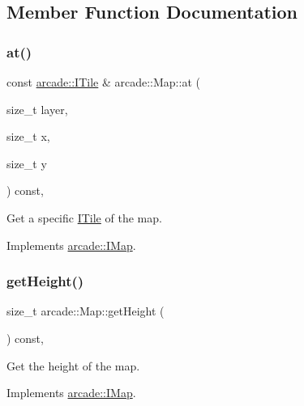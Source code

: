 \subsection{Member Function Documentation}
\mbox{\label{classarcade_1_1_map_a8032d00c437cad8cedb646a0a1eb4bb1}} 
\subsubsection{\texorpdfstring{at()}{at()}}
{\footnotesize\ttfamily const \hyperlink{classarcade_1_1_i_tile}{arcade\+::\+I\+Tile} \& arcade\+::\+Map\+::at (\begin{DoxyParamCaption}\item[{size\+\_\+t}]{layer,  }\item[{size\+\_\+t}]{x,  }\item[{size\+\_\+t}]{y }\end{DoxyParamCaption}) const\hspace{0.3cm}{\ttfamily [override]}, {\ttfamily [virtual]}}



Get a specific \hyperlink{classarcade_1_1_i_tile}{I\+Tile} of the map. 



Implements \hyperlink{classarcade_1_1_i_map_a8206c36a51d8394145fd3b7b29e42f8d}{arcade\+::\+I\+Map}.

\mbox{\label{classarcade_1_1_map_a914cc33687ccf159cc2876fc1d52657d}} 
\subsubsection{\texorpdfstring{get\+Height()}{getHeight()}}
{\footnotesize\ttfamily size\+\_\+t arcade\+::\+Map\+::get\+Height (\begin{DoxyParamCaption}{ }\end{DoxyParamCaption}) const\hspace{0.3cm}{\ttfamily [override]}, {\ttfamily [virtual]}}



Get the height of the map. 



Implements \hyperlink{classarcade_1_1_i_map_a9282ac731fa61b8c18241a309efbd6a0}{arcade\+::\+I\+Map}.

